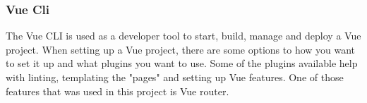 \subsubsection{Vue Cli}
The Vue CLI is used as a developer tool to start, build, manage and deploy a Vue project. When setting up a Vue project, there are some options to how you want to set it up and what plugins you want to use. Some of the plugins available help with linting, templating the "pages" and setting up Vue features. One of those features that was used in this project is Vue router.